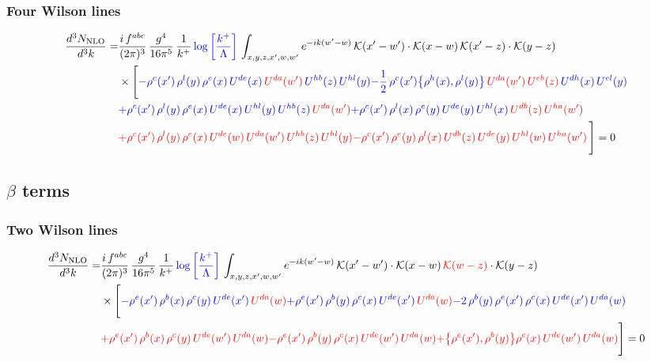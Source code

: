 \documentclass[9pt]{article}
\newcommand{\chg}[1]{{\color{red}#1}}
\numberwithin{equation}{section}
\begin{document}
\subsubsection{Four Wilson lines}
\begin{align}
    \frac{d^{3}N_{\rm NLO}}{d^{3}k}= & \frac{i\,f^{abc}}{(2\pi)^{3}}\,\frac{g^{4}}{16\pi^{5}}\,\frac{1}{k^{+}}\,{\color{blue}\log{\left[\frac{k^{+}}{\Lambda}\right]}}\,\int_{x,y,z,x',w,w'}e^{-ik(w'-w)}\,\mathcal{K}(x'-w')\cdot\mathcal{K}(x-w)\,\mathcal{K}(x'-z)\cdot\mathcal{K}(y-z)\notag \\ & \times\Bigg[{\color{blue}-\rho^{c}(x')\,\rho^{l}(y)\,\rho^{e}(x)\,U^{de}(x)\,{\color{red}U^{da}(w')}\,U^{hb}(z)\,U^{hl}(y)}{\color{blue}-\frac{1}{2}\,\rho^{c}(x')\big\{\rho^{h}(x),\rho^{l}(y)\big\}\,{\color{red}U^{da}(w')}\,{\color{red}U^{eb}(z)}\,U^{dh}(x)\,U^{el}(y)}\notag \\ & {\color{blue}+\rho^{c}(x')\,\rho^{l}(y)\,\rho^{e}(x)\,U^{de}(x)\,U^{hl}(y)\,U^{hb}(z)\,{\color{red}U^{da}(w')}}{\color{blue}+\rho^{c}(x')\,\rho^{l}(x)\,\rho^{e}(y)\,U^{de}(y)\,U^{hl}(x)\,{\color{red}U^{db}(z)}\,{\color{red}U^{ha}(w')}}\notag \\ &{\color{red}+\rho^{c}(x')\,\rho^{l}(y)\,\rho^{e}(x)\,U^{de}(w)\,{\color{red}U^{da}(w')}\,U^{hb}(z)\,U^{hl}(y)}{\color{red}-\rho^{c}(x')\,\rho^{e}(y)\,\rho^{l}(x)\,{\color{red}U^{db}(z)}\,U^{de}(y)\,U^{hl}(w)\,U^{ha}(w')}\,\Bigg] = 0
\end{align}
\subsection{$\beta$ terms}
\subsubsection{Two Wilson lines}
\begin{align}
    \frac{d^{3}N_{\rm NLO}}{d^{3}k}= & \frac{i\,f^{abc}}{(2\pi)^{3}}\,\frac{g^{4}}{16\pi^{5}}\,\frac{1}{k^{+}}\,{\color{blue}\log{\left[\frac{k^{+}}{\Lambda}\right]}}\,\int_{x,y,z,x',w,w'}e^{-ik(w'-w)}\,\mathcal{K}(x'-w')\cdot\mathcal{K}(x-w)\,\chg{\mathcal{K}(w-z)}\cdot\mathcal{K}(y-z)\notag \\ & \times\Bigg[{\color{blue}-\rho^{e}(x')\,\rho^{b}(x)\,\rho^{c}(y)\,U^{de}(x')\,{\color{red}U^{da}(w)}}{\color{blue}+\rho^{e}(x')\,\rho^{b}(y)\,\rho^{c}(x)\,U^{de}(x')\,{\color{red}U^{da}(w)}}{\color{blue}-2\,\rho^{b}(y)\,\rho^{e}(x')\, \rho^{c}(x)\, U^{de}(x')\,U^{da}(w)}\notag \\ & {\color{red}+\rho^{e}(x')\,\rho^{b}(x)\,\rho^{c}(y)\,U^{de}(w')\,{\color{red}U^{da}(w)}}{\color{red}-\rho^{e}(x')\,\rho^{b}(y)\,\rho^{c}(x)\,U^{de}(w')\,{\color{red}U^{da}(w)}}{\color{red}+\big\{\rho^{e}(x'),\rho^{b}(y)\big\}\rho^{c}(x)\,U^{de}(w')\,{\color{red}U^{da}(w)}}\Bigg] = 0
\end{align}   
\end{document}
